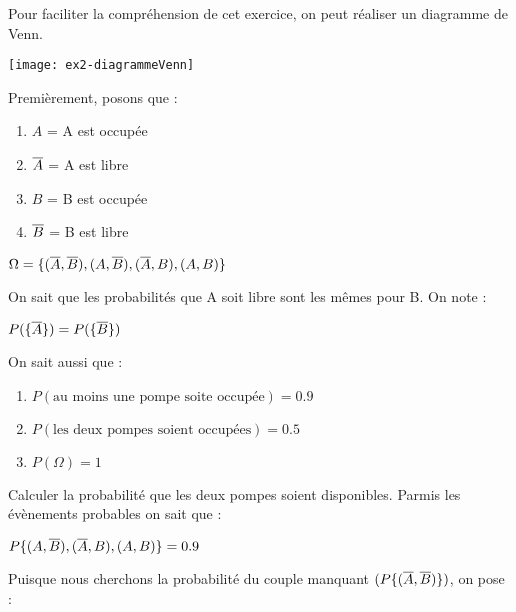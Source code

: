 \begin{exo}

  Pour faciliter la compréhension de cet exercice, on peut réaliser un diagramme de Venn.
  \begin{center}\texttt{[image: ex2-diagrammeVenn]}\end{center}
  Premièrement, posons que :
  \begin{multicols}{4}
    \begin{enumerate}[label=\alph*), parsep=0cm, itemsep=3mm, topsep=3mm]
      \item[ ] $A$ = A est occupée
      \item[ ] $\overline{A}$ = A est libre
      \item[ ] $B$ = B est occupée
      \item[ ] $\overline{B}$ = B est libre
    \end{enumerate}
  \end{multicols}
  \begin{center}$\Omega = \{(\overline{A},\overline{B}),(A,\overline{B}),(\overline{A},B),(A,B)\}$ \end{center}
  On sait que les probabilités que A soit libre sont les mêmes pour B. On note :
  \begin{center}$P(\{\overline{A}\}) = P(\{\overline{B}\})$\end{center}
  On sait aussi que :
  \begin{enumerate}
    \item[ ] $P(\text{au moins une pompe soite occupée}) = 0.9$
    \item[ ] $P(\text{les deux pompes soient occupées}) = 0.5$
    \item[ ] $P(\Omega) = 1$
  \end{enumerate}
  \begin{subexo}{Calculer la probabilité que les deux pompes soient disponibles.}
    Parmis les évènements probables on sait que :
    \begin{center}$P\{(A,\overline{B}),(\overline{A},B),(A,B)\} = 0.9$\end{center}
    Puisque nous cherchons la probabilité du couple manquant $(P\{(\overline{A},\overline{B})\})$, on pose :

\end{subexo}
\end{exo}
